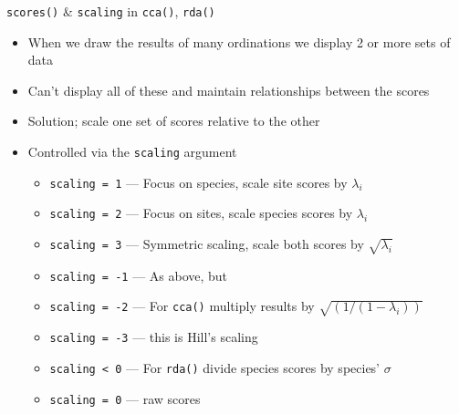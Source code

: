 \documentclass[10pt,ignorenonframetext,compress, aspectratio=169]{beamer}
\providecommand{\tightlist}{%
  \setlength{\itemsep}{0pt}\setlength{\parskip}{0pt}}
\begin{document}
\begin{frame}[fragile]{\texttt{scores()} \& \texttt{scaling} in
\texttt{cca()}, \texttt{rda()}}

\begin{itemize}
\tightlist
\item
  When we draw the results of many ordinations we display 2 or more sets
  of data
\item
  Can't display all of these and maintain relationships between the
  scores
\item
  Solution; scale one set of scores relative to the other
\item
  Controlled via the \texttt{scaling} argument

  \begin{itemize}
  \tightlist
  \item
    \texttt{scaling\ =\ 1} --- Focus on species, scale site scores by
    \(\lambda_i\)
  \item
    \texttt{scaling\ =\ 2} --- Focus on sites, scale species scores by
    \(\lambda_i\)
  \item
    \texttt{scaling\ =\ 3} --- Symmetric scaling, scale both scores by
    \(\sqrt{\lambda_i}\)
  \item
    \texttt{scaling\ =\ -1} --- As above, but
  \item
    \texttt{scaling\ =\ -2} --- For \texttt{cca()} multiply results by
    \(\sqrt{(1/(1-\lambda_i))}\)
  \item
    \texttt{scaling\ =\ -3} --- this is Hill's scaling
  \item
    \texttt{scaling\ \textless{}\ 0} --- For \texttt{rda()} divide
    species scores by species' \(\sigma\)
  \item
    \texttt{scaling\ =\ 0} --- raw scores
  \end{itemize}
\end{itemize}

\end{frame}
\end{document}
